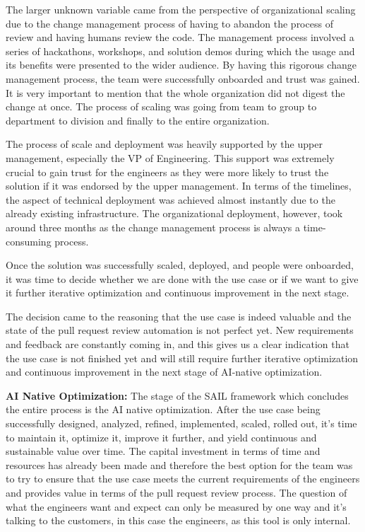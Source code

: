 \documentclass[]{imc-inf}
\begin{document}
The larger unknown variable came from the perspective of organizational scaling due to the change management process of having to abandon the process of review and having humans review the code. The management process involved a series of hackathons, workshops, and solution demos during which the usage and its benefits were presented to the wider audience. By having this rigorous change management process, the team were successfully onboarded and trust was gained. It is very important to mention that the whole organization did not digest the change at once. The process of scaling was going from team to group to department to division and finally to the entire organization.   

The process of scale and deployment was heavily supported by the upper management, especially the VP of Engineering. This support was extremely crucial to gain trust for the engineers as they were more likely to trust the solution if it was endorsed by the upper management. In terms of the timelines, the aspect of technical deployment was achieved almost instantly due to the already existing infrastructure. The organizational deployment, however, took around three months as the change management process is always a time-consuming process.

Once the solution was successfully scaled, deployed, and people were onboarded, it was time to decide whether we are done with the use case or if we want to give it further iterative optimization and continuous improvement in the next stage.

The decision came to the reasoning that the use case is indeed valuable and the state of the pull request review automation is not perfect yet. New requirements and feedback are constantly coming in, and this gives us a clear indication that the use case is not finished yet and will still require further iterative optimization and continuous improvement in the next stage of AI-native optimization.

\textbf{AI Native Optimization:}
The stage of the SAIL framework which concludes the entire process is the AI native optimization. After the use case being successfully designed, analyzed, refined, implemented, scaled, rolled out, it's time to maintain it, optimize it, improve it further, and yield continuous and sustainable value over time. The capital investment in terms of time and resources has already been made and therefore the best option for the team was to try to ensure that the use case meets the current requirements of the engineers and provides value in terms of the pull request review process. The question of what the engineers want and expect can only be measured by one way and it's talking to the customers, in this case the engineers, as this tool is only internal. 
\end{document}
